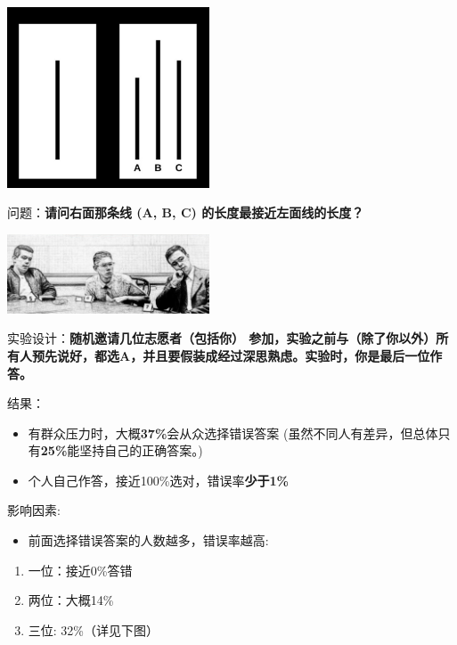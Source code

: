\includegraphics[width=6cm]{Asch0Screenshot_2022-07-09_161023.jpg}

问题：\textbf{请问右面那条线 (A, B, C) 的长度最接近左面线的长度？}


\includegraphics[width=6cm]{Asch2Screenshot2.png}

实验设计：\textbf{随机邀请几位志愿者（包括你）
参加，实验之前与（除了你以外）所有人预先说好，都选A，并且要假装成经过深思熟虑。实验时，你是最后一位作答。}

结果：

\begin{itemize}
\tightlist
\item
  有群众压力时，大概\textbf{37\%}会从众选择错误答案
  (虽然不同人有差异，但总体只有\textbf{25\%}能坚持自己的正确答案。)
\item
  个人自己作答，接近100\%选对，错误率\textbf{少于1\%}
\end{itemize}

影响因素:

\begin{itemize}
\tightlist
\item
  前面选择错误答案的人数越多，错误率越高:
\end{itemize}

\begin{enumerate}
\tightlist
\item
  一位：接近0\%答错
\item
  两位：大概14\%
\item
  三位: 32\%（详见下图）
\end{enumerate}


